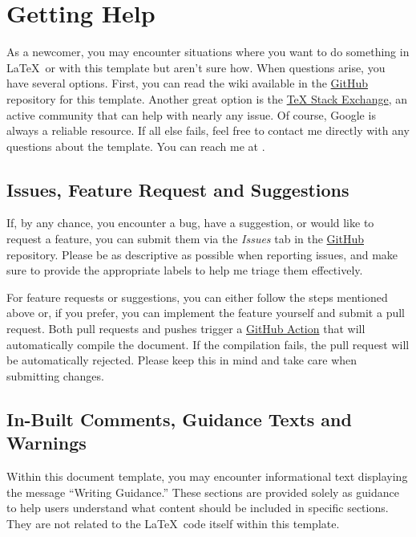 {\section{Getting Help}
As a newcomer, you may encounter situations where you want to do something in \LaTeX~or with this template but aren't sure how. When questions arise, you have several options. First, you can read the wiki available in the \href{https://github.com/joseareia/ipleiria-thesis}{GitHub} repository for this template. Another great option is the \href{https://tex.stackexchange.com/}{TeX Stack Exchange}, an active community that can help with nearly any issue. Of course, Google is always a reliable resource. If all else fails, feel free to contact me directly with any questions about the template. You can reach me at \textit{\textcolor{blue}{}}.

\subsection{Issues, Feature Request and Suggestions}
If, by any chance, you encounter a bug, have a suggestion, or would like to request a feature, you can submit them via the \textit{Issues} tab in the \href{https://github.com/joseareia/ipleiria-thesis}{GitHub} repository. Please be as descriptive as possible when reporting issues, and make sure to provide the appropriate labels to help me triage them effectively.

For feature requests or suggestions, you can either follow the steps mentioned above or, if you prefer, you can implement the feature yourself and submit a pull request. Both pull requests and pushes trigger a \href{https://github.com/joseareia/ipleiria-thesis/actions/workflows/latex.yml}{GitHub Action} that will automatically compile the document. If the compilation fails, the pull request will be automatically rejected. Please keep this in mind and take care when submitting changes.

\subsection{In-Built Comments, Guidance Texts and Warnings}
Within this document template, you may encounter informational text displaying the message ``Writing Guidance.'' These sections are provided solely as guidance to help users understand what content should be included in specific sections. They are not related to the \LaTeX~code itself within this template.

}
